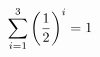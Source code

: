 \documentclass[preview]{standalone}
\begin{document}
\begin{align*}
\sum_{i=1}^{ 3 } \left({ 1 } \over {2} \right)^i = { 1 }
\end{align*}
\end{document}
